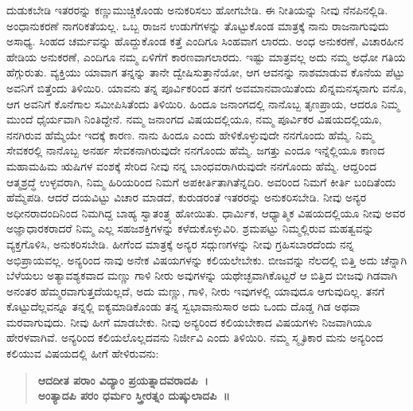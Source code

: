 ದುಡುಕಬೇಡಿ ಇತರರನ್ನು ಕಣ್ಣುಮುಚ್ಚಿಕೊಂಡು ಅನುಕರಿಸಲು ಹೋಗಬೇಡಿ. ಈ ನೀತಿಯನ್ನು ನೀವು ನೆನಪಿನಲ್ಲಿಡಿ. ಅಂಧಾನುಕರಣೆ ನಾಗರಿಕತೆಯಲ್ಲ. ಒಬ್ಬ ರಾಜನ ಉಡುಗೆಗಳನ್ನು ತೊಟ್ಟುಕೊಂಡ ಮಾತ್ರಕ್ಕೆ ನಾನು ರಾಜನಾಗುವುದು ಅಸಾಧ್ಯ. ಸಿಂಹದ ಚರ್ಮವನ್ನು ಹೊದ್ದುಕೊಂಡ ಕತ್ತೆ ಎಂದಿಗೂ ಸಿಂಹವಾಗ ಲಾರದು. ಅಂಧ ಅನುಕರಣೆ, ವಿಚಾರಹೀನ ಹೇಡಿಯ ಅನುಕರಣೆ, ಎಂದಿಗೂ ನಮ್ಮ ಏಳಿಗೆಗೆ ಕಾರಣವಾಗಲಾರದು. ಇಷ್ಟು ಮಾತ್ರವಲ್ಲ ಅದು ನಮ್ಮ ಅಧೋ ಗತಿಯ ಹೆಗ್ಗುರುತು. ವ್ಯಕ್ತಿಯು ಯಾವಾಗ ತನ್ನನ್ನು ತಾನೇ ದ್ವೇಷಿಸುತ್ತಾನೆಯೋ, ಆಗ ಆವನನ್ನು ನಾಶಮಾಡುವ ಕೊನೆಯ ಪೆಟ್ಟು ಅವನಿಗೆ ಬಿತ್ತೆಂದು ತಿಳಿಯಿರಿ. ಯಾವನು ತನ್ನ ಪೂರ್ವಿಕರಿಂದ ತನಗೆ ಅವಮಾನವಾಯಿತೆಂದು ಖಿನ್ನಮನಸ್ಕನಾಗು ವನೊ, ಆಗ ಅವನಿಗೆ ಕೊನೆಗಾಲ ಸಮೀಪಿಸಿತೆಂದು ತಿಳಿಯಿರಿ. ಹಿಂದೂ ಜನಾಂಗದಲ್ಲಿ ನಾನೊಬ್ಬ ತೃಣಪ್ರಾಯ, ಆದರೂ ನಿಮ್ಮ ಮುಂದೆ ಧೈರ್ಯವಾಗಿ ನಿಂತಿದ್ದೇನೆ. ನಮ್ಮ ಜನಾಂಗದ ವಿಷಯದಲ್ಲಿಯೂ, ನಮ್ಮ ಪೂರ್ವಿಕರ ವಿಷಯದಲ್ಲಿಯೂ, ನನಗಿರುವ ಹೆಮ್ಮೆಯೇ ಇದಕ್ಕೆ ಕಾರಣ. ನಾನು ಹಿಂದೂ ಎಂದು ಹೇಳಿಕೊಳ್ಳುವುದೇ ನನಗೊಂದು ಹೆಮ್ಮೆ. ನಿಮ್ಮ ಸೇವಕರಲ್ಲಿ ನಾನೊಬ್ಬ ಅನರ್ಹ ಸೇವಕನಾಗಿರುವುದೇ ನನಗೊಂದು ಹೆಮ್ಮೆ. ಜಗತ್ತು ಎಂದೂ ಇನ್ನೆಲ್ಲಿಯೂ ಕಾಣದ ಮಹಾಮಹಿಮ ಋಷಿಗಳ ವಂಶಕ್ಕೆ ಸೇರಿದ ನೀವು ನನ್ನ ಬಾಂಧವರಾಗಿರುವುದೇ ನನಗೊಂದು ಹೆಮ್ಮೆ. ಆದ್ದರಿಂದ ಆತ್ಮಶ್ರದ್ಧೆ ಉಳ್ಳವರಾಗಿ, ನಿಮ್ಮ ಹಿರಿಯರಿಂದ ನಿಮಗೆ ಅಪಕೀರ್ತಿ\break ತಾಗಿತೆನ್ನದಿರಿ. ಅವರಿಂದ ನಿಮಗೆ ಕೀರ್ತಿ ಬಂದಿತೆಂದು ಹೆಮ್ಮೆಪಡಿ. ಆದರೆ ದಯವಿಟ್ಟು ವಿಚಾರ ಮಾಡದೆ, ಕುರುಡರಂತೆ ಇತರರನ್ನು ಅನುಕರಿಸಬೇಡಿ. ನೀವು ಅನ್ಯರ ಅಧೀನರಾದಂದಿನಿಂದ ನಿಮಗಿದ್ದ ಬಾಹ್ಯ ಸ್ವಾತಂತ್ರ್ಯ ಹೋಯಿತು. ಧಾರ್ಮಿಕ, ಆಧ್ಯಾತ್ಮಿಕ ವಿಷಯದಲ್ಲಿಯೂ ನೀವು ಅವರ ಅಜ್ಞಾಧಾರಕರಾದರೆ ನಿಮ್ಮ ಎಲ್ಲ ಸಹಜಶಕ್ತಿಗಳನ್ನು ಕಳೆದುಕೊಳ್ಳುವಿರಿ. ಶ್ರಮಪಟ್ಟು ನಿಮ್ಮಲ್ಲಿರುವ ಮಹತ್ವವನ್ನು ವ್ಯಕ್ತಗೊಳಿಸಿ, ಅನುಕರಿಸಬೇಡಿ. ಹೀಗೆಂದ ಮಾತ್ರಕ್ಕೆ ಅನ್ಯರ ಸದ್ಗುಣಗಳನ್ನು ನೀವು ಗ್ರಹಿಸಬಾರದೆಂದು ನನ್ನ ಅಭಿಪ್ರಾಯವಲ್ಲ. ಅನ್ಯರಿಂದ ನಾವು ಅನೇಕ ವಿಷಯಗಳನ್ನು ಕಲಿಯಲೇಬೇಕು. ಬೀಜವನ್ನು ನೆಲದಲ್ಲಿ ಬಿತ್ತಿ ಅದು ಚೆನ್ನಾಗಿ ಬೆಳೆಯಲು ಅತ್ಯಾವಶ್ಯಕವಾದ ಮಣ್ಣು ಗಾಳಿ ನೀರು ಅವುಗಳನ್ನು ಯಥೇಚ್ಛವಾಗಿಕೊಟ್ಟರೆ ಆ ಬಿತ್ತಿದ ಬೀಜವು ಗಿಡವಾಗಿ ಅನಂತರ ಹೆಮ್ಮರವಾಗುತ್ತದೆಯಲ್ಲದೆ, ಅದು ಮಣ್ಣು, ಗಾಳಿ, ನೀರು ಇವುಗಳಲ್ಲಿ ಯಾವುದೂ ಆಗುವುದಿಲ್ಲ. ತನಗೆ ಕೊಟ್ಟುದೆಲ್ಲವನ್ನೂ ತನ್ನಲ್ಲಿ ಐಕ್ಯಮಾಡಿಕೊಂಡು ತನ್ನ ಸ್ವಭಾವಾನುಸಾರ ಅದು ಒಂದು ದೊಡ್ಡ ಗಿಡ ಅಥವಾ ಮರವಾಗುವುದು. ನೀವು ಹೀಗೆ ಮಾಡಬೇಕು. ನೀವು ಅನ್ಯರಿಂದ ಕಲಿಯಬೇಕಾದ ವಿಷಯಗಳು ನಿಜವಾಗಿಯೂ ಹೇರಳವಾಗಿವೆ. ಅನ್ಯರಿಂದ ಕಲಿಯಲೊಲ್ಲದವನು ನಿರ್ಜೀವಿ ಎಂದು ತಿಳಿಯಿರಿ. ನಮ್ಮ ಸ್ಮೃತಿಕಾರ ಮನು ಅನ್ಯರಿಂದ ಕಲಿಯುವ ವಿಷಯದಲ್ಲಿ ಹೀಗೆ ಹೇಳಿರುವನು:

\begin{verse}
\textbf{ಆದದೀತ ಪರಾಂ ವಿದ್ಯಾಂ ಪ್ರಯತ್ನಾದವರಾದಪಿ~।}\\\textbf{ಅಂತ್ಯಾದಪಿ ಪರಂ ಧರ್ಮಂ ಸ್ತ್ರೀರತ್ನಂ ದುಷ್ಕುಲಾದಪಿ~॥}
\end{verse}


